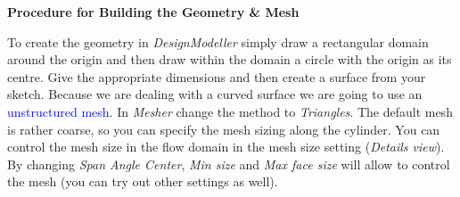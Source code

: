 \documentclass[12pts,a4paper,amsmath,amssymb,floatfix]{article}%
\newcommand{\blue}{\textcolor{blue}}
\begin{document}
     \begin{center}
       {\bf Procedure for Building the Geometry \& Mesh}
     \end{center}
     To create the geometry in \emph{DesignModeller} simply draw a rectangular domain around the origin and then draw within the domain a circle with the origin as its centre.  Give the appropriate dimensions and then create a surface from your sketch. Because we are dealing with a curved surface we are going to use an \blue{unstructured mesh}. In \emph{Mesher} change the method to \emph{Triangles}. The default mesh is rather coarse, so you can specify the mesh sizing along the cylinder. You can control the mesh size in the flow domain in the mesh size setting (\emph{Details view}).  By changing \emph{Span Angle Center}, \emph{Min size} and \emph{Max face size} will allow to control the mesh (you can try out other settings as well).
\end{document}
